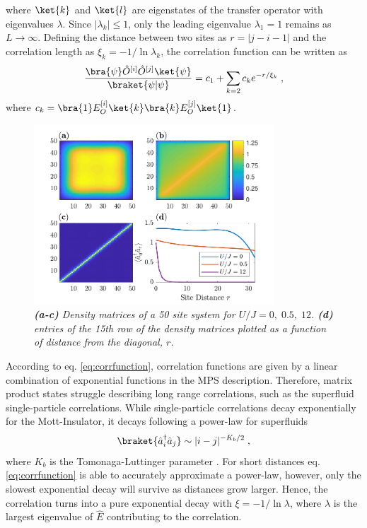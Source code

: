 where $\ket{k}$ and $\ket{l}$ are eigenstates of the transfer operator with eigenvalues $\lambda$. Since $|\lambda_k| \leq 1 $, only the leading eigenvalue $\lambda_1 = 1$ remains as $L \to \infty$. Defining the distance between two sites as $r = |j - i -1|$ and the correlation  length as $\xi_k = -1/\ln \lambda_k$, the correlation function can be written as
\begin{equation}
	\frac{\bra{\psi} \hat{O}^{[i]} \hat{O}^{[j]} \ket{\psi}}{\braket{\psi | \psi}} = c_1 + \sum_{k = 2} c_k e^{-r/ \xi_k} \; , \label{eq:corrfunction}
\end{equation}
where $c_k = \bra{1} E_{O}^{[i]} \ket{k} \bra{k} E_{O}^{[j]} \ket{1}$. \cite{schollwock} \\
\begin{figure}[h!]
    \centering
    \includegraphics[width=0.8\textwidth]{Figures/DensityMatrices.pdf}
    \caption{\textit{\textbf{(a-c)} Density matrices of a 50 site system for $U/J = 0, \; 0.5, \; 12$. \textbf{(d)} entries of the 15th row of the density matrices plotted as a function of distance from the diagonal, $r$. }}
    \label{fig:DensityMatrices}
\end{figure}
According to eq. \eqref{eq:corrfunction}, correlation functions are given by a linear combination of exponential functions in the MPS description. Therefore, matrix product states struggle describing long range correlations, such as the superfluid single-particle correlations. While single-particle correlations decay exponentially for the Mott-Insulator, it decays following a power-law for superfluids
\begin{equation}
	\braket{\hat{a}_{i}^{\dag} \hat{a}_{j}} \sim |i - j|^{-K_b /2} \; ,
	\label{eq:superfluidCorrelation}
\end{equation}
where $K_b$ is the Tomonaga-Luttinger parameter \cite{characPhases}. For short distances eq. \eqref{eq:corrfunction} is able to accurately approximate a power-law, however, only the slowest exponential decay will survive as distances grow larger. Hence, the correlation turns into a pure exponential decay with $\xi = -1/ \ln \lambda$, where $\lambda$ is the largest eigenvalue of $\hat{E}$ contributing to the correlation.\\
